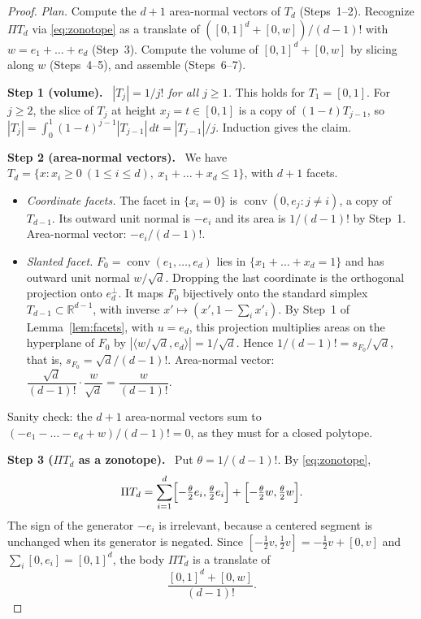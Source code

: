 \documentclass[11pt]{article}
\newcommand{\R}{\mathbb R}
\DeclareMathOperator{\conv}{conv}
\newcommand{\step}[1]{\par\smallskip\noindent\textbf{#1}\ }
\begin{document}
\begin{proof}
\emph{Plan.} Compute the \(d+1\) area-normal vectors of \(T_d\)
(Steps~1--2). Recognize \(\Pi T_d\) via \eqref{eq:zonotope} as a translate
of \(([0,1]^d+[0,w])/(d-1)!\) with \(w=e_1+\dots+e_d\) (Step~3). Compute
the volume of \([0,1]^d+[0,w]\) by slicing along \(w\) (Steps~4--5), and
assemble (Steps~6--7).

\step{Step 1 (volume).} \emph{\(|T_j|=1/j!\) for all \(j\ge1\).} This holds
for \(T_1=[0,1]\). For \(j\ge2\), the slice of \(T_j\) at height
\(x_j=t\in[0,1]\) is a copy of \((1-t)T_{j-1}\), so
\(|T_j|=\int_0^1(1-t)^{j-1}|T_{j-1}|\,dt=|T_{j-1}|/j\). Induction gives the
claim.

\step{Step 2 (area-normal vectors).} We have
\(T_d=\{x:x_i\ge0\ (1\le i\le d),\ x_1+\dots+x_d\le1\}\), with \(d+1\)
facets.
\begin{itemize}[leftmargin=2em,itemsep=2pt]
\item \emph{Coordinate facets.} The facet in \(\{x_i=0\}\) is
 \(\conv(0,e_j:j\ne i)\), a copy of \(T_{d-1}\). Its outward unit normal is
 \(-e_i\) and its area is \(1/(d-1)!\) by Step~1. Area-normal vector:
 \(-e_i/(d-1)!\).
\item \emph{Slanted facet.} \(F_0=\conv(e_1,\dots,e_d)\) lies in
 \(\{x_1+\dots+x_d=1\}\) and has outward unit normal \(w/\sqrt d\).
 Dropping the last coordinate is the orthogonal projection onto
 \(e_d^\perp\). It maps \(F_0\) bijectively onto the standard simplex
 \(T_{d-1}\subset\R^{d-1}\), with inverse
 \(x'\mapsto(x',1-\sum_ix'_i)\). By Step~1 of Lemma~\ref{lem:facets}, with
 \(u=e_d\), this projection multiplies areas on the hyperplane of \(F_0\)
 by \(|\langle w/\sqrt d,e_d\rangle|=1/\sqrt d\). Hence
 \(1/(d-1)!=s_{F_0}/\sqrt d\), that is, \(s_{F_0}=\sqrt d/(d-1)!\).
 Area-normal vector:
 \(\dfrac{\sqrt d}{(d-1)!}\cdot\dfrac{w}{\sqrt d}=\dfrac{w}{(d-1)!}\).
\end{itemize}
Sanity check: the \(d+1\) area-normal vectors sum to
\((-e_1-\dots-e_d+w)/(d-1)!=0\), as they must for a closed polytope.

\step{Step 3 (\(\Pi T_d\) as a zonotope).} Put \(\theta=1/(d-1)!\). By
\eqref{eq:zonotope},
\[
 \Pi T_d=\sum_{i=1}^d\Bigl[-\tfrac\theta2e_i,\tfrac\theta2e_i\Bigr]
 +\Bigl[-\tfrac\theta2w,\tfrac\theta2w\Bigr].
\]
The sign of the generator \(-e_i\) is irrelevant, because a centered
segment is unchanged when its generator is negated. Since
\([-\tfrac12v,\tfrac12v]=-\tfrac12v+[0,v]\) and
\(\sum_i[0,e_i]=[0,1]^d\), the body \(\Pi T_d\) is a translate of
\[
 \frac{[0,1]^d+[0,w]}{(d-1)!}.
\]


\end{proof}
\end{document}
